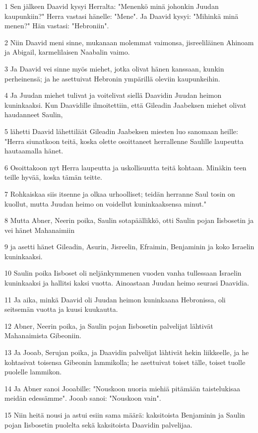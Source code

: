 \par 1 Sen jälkeen Daavid kysyi Herralta: "Menenkö minä johonkin Juudan kaupunkiin?" Herra vastasi hänelle: "Mene". Ja Daavid kysyi: "Mihinkä minä menen?" Hän vastasi: "Hebroniin".
\par 2 Niin Daavid meni sinne, mukanaan molemmat vaimonsa, jisreeliläinen Ahinoam ja Abigail, karmelilaisen Naabalin vaimo.
\par 3 Ja Daavid vei sinne myös miehet, jotka olivat hänen kanssaan, kunkin perheinensä; ja he asettuivat Hebronin ympärillä oleviin kaupunkeihin.
\par 4 Ja Juudan miehet tulivat ja voitelivat siellä Daavidin Juudan heimon kuninkaaksi. Kun Daavidille ilmoitettiin, että Gileadin Jaabeksen miehet olivat haudanneet Saulin,
\par 5 lähetti Daavid lähettiläät Gileadin Jaabeksen miesten luo sanomaan heille: "Herra siunatkoon teitä, koska olette osoittaneet herrallenne Saulille laupeutta hautaamalla hänet.
\par 6 Osoittakoon nyt Herra laupeutta ja uskollisuutta teitä kohtaan. Minäkin teen teille hyvää, koska tämän teitte.
\par 7 Rohkaiskaa siis itsenne ja olkaa urhoolliset; teidän herranne Saul tosin on kuollut, mutta Juudan heimo on voidellut kuninkaaksensa minut."
\par 8 Mutta Abner, Neerin poika, Saulin sotapäällikkö, otti Saulin pojan Iisbosetin ja vei hänet Mahanaimiin
\par 9 ja asetti hänet Gileadin, Asurin, Jisreelin, Efraimin, Benjaminin ja koko Israelin kuninkaaksi.
\par 10 Saulin poika Iisboset oli neljänkymmenen vuoden vanha tullessaan Israelin kuninkaaksi ja hallitsi kaksi vuotta. Ainoastaan Juudan heimo seurasi Daavidia.
\par 11 Ja aika, minkä Daavid oli Juudan heimon kuninkaana Hebronissa, oli seitsemän vuotta ja kuusi kuukautta.
\par 12 Abner, Neerin poika, ja Saulin pojan Iisbosetin palvelijat lähtivät Mahanaimista Gibeoniin.
\par 13 Ja Jooab, Serujan poika, ja Daavidin palvelijat lähtivät hekin liikkeelle, ja he kohtasivat toisensa Gibeonin lammikolla; he asettuivat toiset tälle, toiset tuolle puolelle lammikon.
\par 14 Ja Abner sanoi Jooabille: "Nouskoon nuoria miehiä pitämään taistelukisaa meidän edessämme". Jooab sanoi: "Nouskoon vain".
\par 15 Niin heitä nousi ja astui esiin sama määrä: kaksitoista Benjaminin ja Saulin pojan Iisbosetin puolelta sekä kaksitoista Daavidin palvelijaa.

